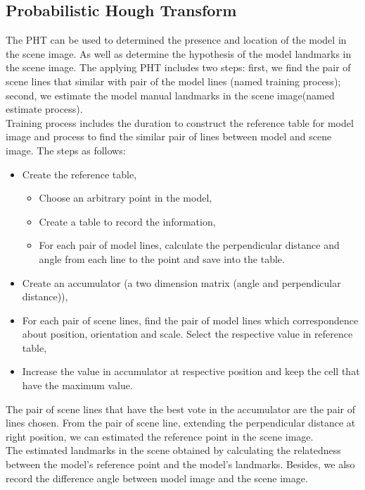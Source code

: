 \documentclass[11pt, twocolumn, a4paper]{article}
\begin{document}
\subsection{Probabilistic Hough Transform}
The PHT can be used to determined the presence and location of the model in the scene image. As well as determine the hypothesis of the model landmarks in the scene image. The applying PHT includes two steps: first, we find the pair of scene lines that similar with pair of the model lines (named training process); second, we estimate the model manual landmarks in the scene image(named estimate process).\\[0.2cm]
Training process includes the duration to construct the reference table for model image and process to find the similar pair of lines between model and scene image. The steps as follows:
\begin{itemize}
	\item Create the reference table,
		\begin{itemize}
			\item Choose an arbitrary point in the model,
			\item Create a table to record the information,
			\item For each pair of model lines, calculate the perpendicular distance and angle from each line to the point and save into the table.
		\end{itemize}
	\item Create an accumulator (a two dimension matrix (angle and perpendicular distance)),
	\item For each pair of scene lines, find the pair of model lines which correspondence about position, orientation and scale. Select the respective value in reference table,
	\item Increase the value in accumulator at respective position and keep the cell that have the maximum value.
\end{itemize}
The pair of scene lines that have the best vote in the accumulator are the pair of lines chosen. From the pair of scene line, extending the perpendicular distance at right position, we can estimated the reference point in the scene image.\\[0.3cm]
The estimated landmarks in the scene obtained by calculating the relatedness between the model's reference point and the model's landmarks. Besides, we also record the difference angle between model image and the scene image. 
\end{document}
